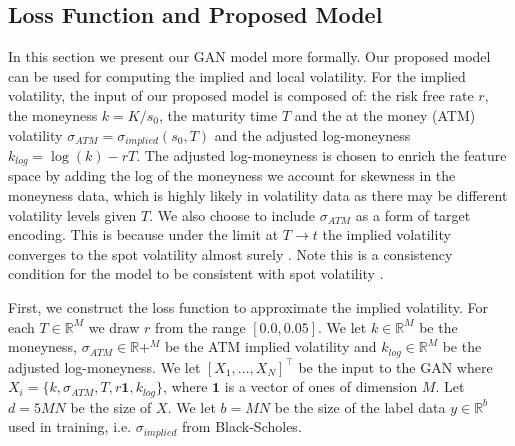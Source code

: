 \documentclass{article}
\theoremstyle{plain}%
\theoremstyle{definition}
\theoremstyle{remark}
\begin{document}
\subsection{Loss Function and Proposed Model}

In this section we present our GAN model more formally. Our proposed model can be used for computing the implied and local volatility. For the implied volatility, the input of our proposed model is composed of: the risk free rate $r$, the moneyness $k = K/s_0$, the maturity time $T$ and the at the money (ATM) volatility $\sigma_{ATM} = \sigma_{implied}(s_0,T)$ and the adjusted log-moneyness $k_{log} = \log(k) - rT$. The adjusted log-moneyness is chosen to enrich the feature space by adding the log of the moneyness we account for skewness in the moneyness data, which is highly likely in volatility data as there may be different volatility levels given $T$. We also choose to include $\sigma_{ATM}$ as a form of target encoding. This is because under the limit at $T\rightarrow t$ the implied volatility converges to the spot volatility almost surely \citep{durrleman-2008}. Note this is a consistency condition for the model to be consistent with spot volatility \citep{durrleman-2008, carmona-2007}.

First, we construct the loss function to approximate the implied volatility. For each $T \in \mathbb{R}^{M}$ we draw $r$ from the range $[0.0,0.05]$. We let $k \in \mathbb{R}^{M}$ be the moneyness, $\sigma_{ATM}\in\mathbb{R}{+}^{M}$ be the ATM implied volatility and $k_{log} \in \mathbb{R}^{M}$ be the adjusted log-moneyness. We let $[X_1,...,X_N]^\top$ be the input to the GAN where $X_i = \{k,\sigma_{ATM},T,r\mathbf{1},k_{log}\}$, where $\mathbf{1}$ is a vector of ones of dimension $M$. Let $d = 5MN$ be the size of $X$. We let $b=MN$ be the size of the label data $y \in \mathbb{R}^{b}$ used in training, i.e. $\sigma_{implied}$ from Black-Scholes.
\end{document}
